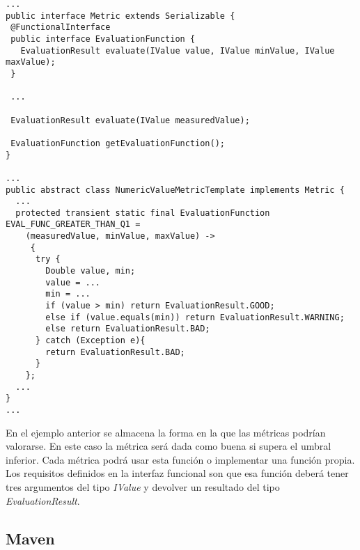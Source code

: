\begin{minipage}{\linewidth}
{\tiny
\begin{lstlisting}[breaklines]
...
public interface Metric extends Serializable {
 @FunctionalInterface
 public interface EvaluationFunction {
   EvaluationResult evaluate(IValue value, IValue minValue, IValue maxValue);
 }

 ...
 
 EvaluationResult evaluate(IValue measuredValue);

 EvaluationFunction getEvaluationFunction();
}

...
public abstract class NumericValueMetricTemplate implements Metric {
  ...
  protected transient static final EvaluationFunction EVAL_FUNC_GREATER_THAN_Q1 = 
    (measuredValue, minValue, maxValue) -> 
     {
      try {
        Double value, min;
	    value = ...
	    min = ...
	    if (value > min) return EvaluationResult.GOOD;
	    else if (value.equals(min)) return EvaluationResult.WARNING;
	    else return EvaluationResult.BAD;
	  } catch (Exception e){
	    return EvaluationResult.BAD;
	  }
    };
  ...
}
...
\end{lstlisting}
}
\end{minipage}

En el ejemplo anterior se almacena la forma en la que las métricas podrían valorarse. En este caso la métrica será dada como buena si supera el umbral inferior. Cada métrica podrá usar esta función o implementar una función propia. Los requisitos definidos en la interfaz funcional son que esa función deberá tener tres argumentos del tipo \textit{IValue} y devolver un resultado del tipo \textit{EvaluationResult}.

\subsection{Maven}

